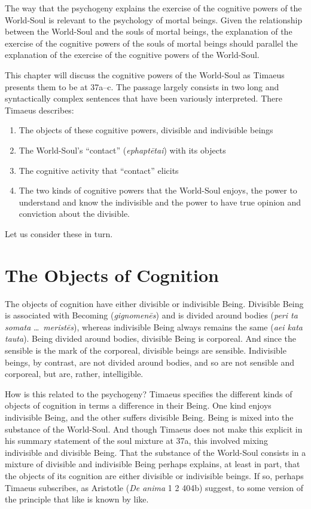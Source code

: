 The way that the psychogeny explains the exercise of the cognitive powers of the World-Soul is relevant to the psychology of mortal beings. Given the relationship between the World-Soul and the souls of mortal beings, the explanation of the exercise of the cognitive powers of the souls of mortal beings should parallel the explanation of the exercise of the cognitive powers of the World-Soul. 

This chapter will discuss the cognitive powers of the World-Soul as Timaeus presents them to be at 37a--c. The passage largely consists in two long and syntactically complex sentences that have been variously interpreted. There Timaeus describes:
\begin{enumerate}[(1)]
	\item The objects of these cognitive powers, divisible and indivisible beings
	\item The World-Soul's ``contact'' (\emph{ephaptētai}) with its objects
	\item The cognitive activity that ``contact'' elicits
	\item The two kinds of cognitive powers that the World-Soul enjoys, the power to understand and know the indivisible and the power to have true opinion and conviction about the divisible.
\end{enumerate}
Let us consider these in turn.


\section{The Objects of Cognition} %
\label{sec:the_objects_of_cognition}

The objects of cognition have either divisible or indivisible Being. Divisible Being is associated with Becoming (\emph{gignomenēs}) and is divided around bodies (\emph{peri ta somata} \ldots\ \emph{meristēs}), whereas indivisible Being always remains the same (\emph{aei kata tauta}). Being divided around bodies, divisible Being is corporeal. And since the sensible is the mark of the corporeal, divisible beings are sensible. Indivisible beings, by contrast, are not divided around bodies, and so are not sensible and corporeal, but are, rather, intelligible.

How is this related to the psychogeny? Timaeus specifies the different kinds of objects of cognition in terms a difference in their Being. One kind enjoys indivisible Being, and the other suffers divisible Being. Being is mixed into the substance of the World-Soul. And though Timaeus does not make this explicit in his summary statement of the soul mixture at 37a, this involved mixing indivisible and divisible Being. That the substance of the World-Soul consists in a mixture of divisible and indivisible Being perhaps explains, at least in part, that the objects of its cognition are either divisible or indivisible beings. If so, perhaps Timaeus subscribes, as Aristotle (\emph{De anima} 1 2 404b) suggest, to some version of the principle that like is known by like. 

